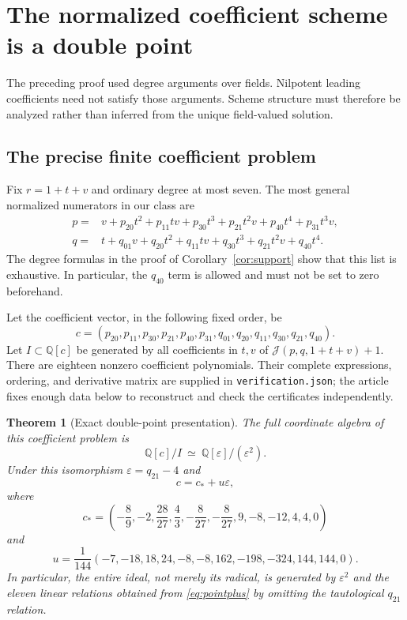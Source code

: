 \documentclass[11pt,a4paper]{article}
\numberwithin{equation}{section}
\newtheorem{theorem}{Theorem}[section]
\theoremstyle{definition}
\theoremstyle{remark}
\newcommand{\Q}{\mathbb{Q}}
\newcommand{\J}{\mathcal{J}}
\newcommand{\cstar}{c_*}
\newcommand{\eps}{\varepsilon}
\begin{document}
\section{The normalized coefficient scheme is a double point}
\label{sec:scheme}

The preceding proof used degree arguments over fields. Nilpotent leading
coefficients need not satisfy those arguments. Scheme structure must
therefore be analyzed rather than inferred from the unique field-valued
solution.

\subsection{The precise finite coefficient problem}

Fix $r=1+t+v$ and ordinary degree at most seven. The most general normalized
numerators in our class are
\begin{align}
p={}&v+p_{20}t^2+p_{11}tv+p_{30}t^3+p_{21}t^2v
       +p_{40}t^4+p_{31}t^3v,\label{eq:scheme-p}\\
q={}&t+q_{01}v+q_{20}t^2+q_{11}tv+q_{30}t^3
       +q_{21}t^2v+q_{40}t^4.\label{eq:scheme-q}
\end{align}
The degree formulas in the proof of Corollary~\ref{cor:support} show that
this list is exhaustive. In particular, the $q_{40}$ term is allowed and
must not be set to zero beforehand.

Let the coefficient vector, in the following fixed order, be
\begin{equation}\label{eq:coordorder}
c=(p_{20},p_{11},p_{30},p_{21},p_{40},p_{31},
       q_{01},q_{20},q_{11},q_{30},q_{21},q_{40}).
\end{equation}
Let $I\subset\Q[c]$ be generated by all coefficients in $t,v$ of
$\J(p,q,1+t+v)+1$. There are eighteen nonzero coefficient polynomials.
Their complete expressions, ordering, and derivative matrix are supplied
in \texttt{verification.json}; the article fixes enough data below to
reconstruct and check the certificates independently.

\begin{theorem}[Exact double-point presentation]\label{thm:double}
The full coordinate algebra of this coefficient problem is
\begin{equation}\label{eq:dualnumbers}
\Q[c]/I\ \simeq\ \Q[\eps]/(\eps^2).
\end{equation}
Under this isomorphism $\eps=q_{21}-4$ and
\begin{equation}\label{eq:pointplus}
c=\cstar+u\eps,
\end{equation}
where
\begin{equation}\label{eq:cstar}
\cstar=\left(-\frac89,-2,\frac{28}{27},\frac43,-\frac8{27},-\frac8{27},
                     9,-8,-12,4,4,0\right)
\end{equation}
and
\begin{equation}\label{eq:u}
u=\frac1{144}(-7,-18,18,24,-8,-8,162,-198,-324,144,144,0).
\end{equation}
In particular, the entire ideal, not merely its radical, is generated by
$\eps^2$ and the eleven linear relations obtained from
\eqref{eq:pointplus} by omitting the tautological $q_{21}$ relation.
\end{theorem}
\end{document}
